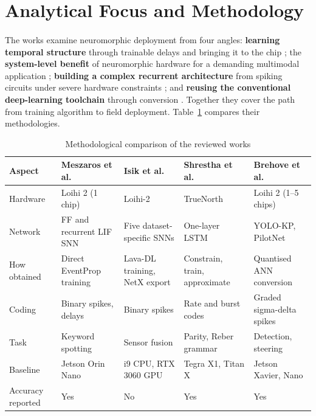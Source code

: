 \documentclass[12pt,a4paper,final]{extreport}
\begin{document}
\section{Analytical Focus and Methodology}

\paragraph{} The works examine neuromorphic deployment from four angles: \textbf{learning temporal structure} through trainable delays and bringing it to the chip \cite{p1}; the \textbf{system-level benefit} of neuromorphic hardware for a demanding multimodal application \cite{p2}; \textbf{building a complex recurrent architecture} from spiking circuits under severe hardware constraints \cite{p3}; and \textbf{reusing the conventional deep-learning toolchain} through conversion \cite{p4}. Together they cover the path from training algorithm to field deployment. Table~\ref{tab:cmp_method} compares their methodologies.

{\renewcommand{\arraystretch}{1.15}
\begin{table}[htbp]
\centering
\caption{Methodological comparison of the reviewed works}\label{tab:cmp_method}
\small
\begin{tabularx}{\textwidth}{|p{2.2cm}|X|X|X|X|}
\hline
\textbf{Aspect} & \textbf{Meszaros et al. \cite{p1}} & \textbf{Isik et al. \cite{p2}} & \textbf{Shrestha et al. \cite{p3}} & \textbf{Brehove et al. \cite{p4}} \\ \hline
Hardware & Loihi 2 (1 chip) & Loihi-2 & TrueNorth & Loihi 2 (1--5 chips) \\ \hline
Network & FF and recurrent LIF SNN & Five dataset-specific SNNs & One-layer LSTM & YOLO-KP, PilotNet \\ \hline
How obtained & Direct EventProp training & Lava-DL training, NetX export & Constrain, train, approximate & Quantised ANN conversion \\ \hline
Coding & Binary spikes, delays & Binary spikes & Rate and burst codes & Graded sigma-delta spikes \\ \hline
Task & Keyword spotting & Sensor fusion & Parity, Reber grammar & Detection, steering \\ \hline
Baseline & Jetson Orin Nano & i9 CPU, RTX 3060 GPU & Tegra X1, Titan X & Jetson Xavier, Nano \\ \hline
Accuracy reported & Yes & No & Yes & Yes \\ \hline
\end{tabularx}
\end{table}}
\end{document}
